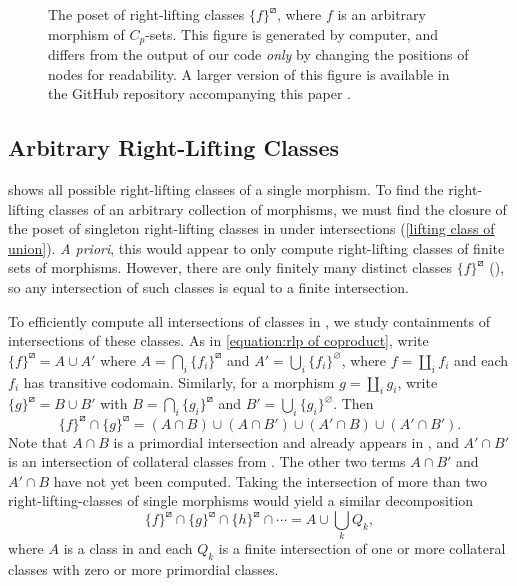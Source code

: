 \documentclass{amsart}
\renewcommand\emptyset\varnothing
\newcommand{\rlp}[1]{{#1}^{\boxslash}}
\numberwithin{equation}{section}
\theoremstyle{definition}
\begin{document}
\begin{figure}[h]
	
	\caption{The poset of right-lifting classes $\rlp{\{f\}}$, where $f$ is an arbitrary morphism of $C_p$-sets. This figure is generated by computer, and differs from the output of our code \textit{only} by changing the positions of nodes for readability. A larger version of this figure is available in the GitHub repository accompanying this paper \cite{code}.}
	\label{figure:singleton rlcs}
\end{figure}


\subsection{Arbitrary Right-Lifting Classes}

 shows all possible right-lifting classes of a single morphism. To find the right-lifting classes of an arbitrary collection of morphisms, we must find the closure of the poset of singleton right-lifting classes in  under intersections (\cref{lifting class of union}). \emph{A priori}, this would appear to only compute right-lifting classes of finite sets of morphisms. However, there are only finitely many distinct classes $\rlp{\{f\}}$ (), so any intersection of such classes is equal to a finite intersection.

To efficiently compute all intersections of classes in , we study containments of intersections of these classes. As in \cref{equation:rlp of coproduct}, write $\rlp{\{f\}} = A \cup A'$ where $A = \bigcap_i \rlp{\{f_i\}}$ and $A' = \bigcup_i \{f_i\}^\emptyset$, where $f = \coprod_i f_i$ and each $f_i$ has transitive codomain. Similarly, for a morphism $g = \coprod_i g_i$, write $\rlp{\{g\}} = B \cup B'$ with $B = \bigcap_i \rlp{\{g_i\}}$ and $B' = \bigcup_i \{g_i\}^\emptyset$.  Then
\[
	\rlp{\{f\}} \cap \rlp{\{g\}} = (A \cap B) \cup (A \cap B') \cup (A' \cap B) \cup (A' \cap B').
\]
Note that $A \cap B$ is a primordial intersection and already appears in , and $A' \cap B'$ is an intersection of collateral classes from . The other two terms $A \cap B'$ and $A' \cap B$ have not yet been computed. Taking the intersection of more than two right-lifting-classes of single morphisms would yield a similar decomposition
	\begin{equation}
		\label{intersection of rlc of three morphisms}
		\rlp{\{f\}} \cap \rlp{\{g\}} \cap \rlp{\{h\}} \cap \cdots = A \cup \bigcup_k Q_k,
	\end{equation}
	where $A$ is a class in  and each $Q_k$ is a finite intersection of one or more collateral classes with zero or more primordial classes.
\end{document}

